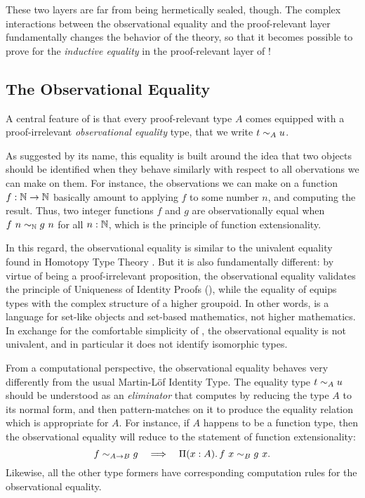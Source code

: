 These two layers are far from being hermetically sealed, though. 
% 
The complex interactions between the observational equality and the 
proof-relevant layer fundamentally changes the behavior of the theory, so
that it becomes possible to prove
for the \emph{inductive equality} in the proof-relevant layer of \SetoidCC!

\subsection{The Observational Equality}

A central feature of \SetoidCC is that every proof-relevant
% 
% 
type \( A \) comes equipped with a proof-irrelevant \emph{observational equality} 
type, that we write \( {\Obseq[A]{t}{u}} \).

As suggested by its name, this equality is built around the idea that two 
objects should be identified when they behave similarly with respect to all 
obervations we can make on them.
% 
For instance, the observations we can make on a function \( f : \Nat \to \Nat \) 
basically amount to applying \( f \) to some number \( n \), and computing the
result. 
% 
Thus, two integer functions \( f \) and \( g \) are observationally equal 
when \( \Obseq[\Nat]{f\ n}{g\ n} \) for all \( n : \Nat \),
which is the principle of function extensionality.

In this regard, the observational equality is similar to the univalent equality 
found in Homotopy Type Theory . 
% 
But it is also fundamentally different: 
% 
by virtue of being a proof-irrelevant proposition, the observational equality 
validates the principle of Uniqueness of Identity Proofs (\UIP), while the 
equality of \HoTT equips types with the complex structure of a higher groupoid.
% 
In other words, \SetoidCC is a language for set-like objects and set-based 
mathematics, not higher mathematics.
% 
In exchange for the comfortable simplicity of \UIP, the observational equality
is not univalent, and in particular it does not identify isomorphic types.

From a computational perspective, the observational equality behaves very 
differently from the usual Martin-Löf Identity Type.
% 
The equality type \( \Obseq[A]{t}{u} \) should be understood 
as an \emph{eliminator} that computes by reducing the type \( A \) to its 
normal form, and then pattern-matches on it to produce the equality 
relation which is appropriate for \( A \). For instance, if \( A \) happens
to be a function type, then the observational equality will reduce to the
statement of function extensionality:
\[
	\Obseq[\Fun{A}{B}]{f}{g} \quad \Longrightarrow \quad \Depfun{A}{\Obseq[B]{f\ x}{g\ x}}.
\]
Likewise, all the other type formers have corresponding computation rules for the
observational equality.

